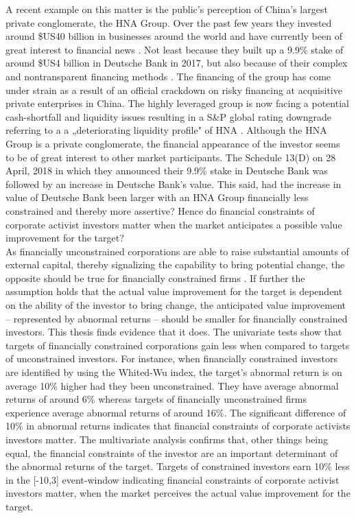\documentclass[12pt]{article}
\begin{document}
A recent example on this matter is the public's perception of China's largest private conglomerate, the HNA Group. Over the past few years they invested around \$US40 billion in businesses around the world and have currently been of great interest to financial news \citep{Smith2018}. Not least because they built up a 9.9\% stake of around \$US4 billion in Deutsche Bank in 2017, but also because of their complex and nontransparent financing methods \citep{Lockett2018}.
The financing of the group has come under strain as a result of an official crackdown on risky financing at acquisitive private enterprises in China. The highly leveraged group is now facing a potential cash-shortfall and liquidity issues resulting in a S\&P global rating downgrade referring to a a „deteriorating liquidity profile" of HNA \citep{Schuetze2018}. Although the HNA Group is a private conglomerate, the financial appearance of the investor seems to be of great interest to other market participants. The Schedule 13(D) on 28 April, 2018 in which they announced their 9.9\% stake in Deutsche Bank was followed by an increase in Deutsche Bank's value. This said, had the increase in value of Deutsche Bank been larger with an HNA Group financially less constrained and thereby more assertive? Hence do financial constraints of corporate activist investors matter when the market anticipates a possible value improvement for the target?\\ 
As financially unconstrained corporations are able to raise substantial amounts of external capital, thereby signalizing the capability to bring potential change, the opposite should be true for financially constrained firms \citep[p.1]{Farre-mensa2013}. If further the assumption holds that the actual value improvement for the target is dependent on the ability of the investor to bring change, the anticipated value improvement -- represented by abnormal returns -- should be smaller for financially constrained investors.
This thesis finds evidence that it does. The univariate tests show that targets of financially constrained corporations gain less when compared to targets of unconstrained investors. For instance, when financially constrained investors are identified by using the Whited-Wu index, the target's abnormal return is on average 10\% higher had they been unconstrained. They have average abnormal returns of around 6\% whereas targets of financially unconstrained firms experience average abnormal returns of around 16\%. The significant difference of 10\% in abnormal returns indicates that financial constraints of corporate activists investors matter. The multivariate analysis confirms that, other things being equal, the financial constraints of the investor are an important determinant of the abnormal returns of the target. Targets of constrained investors earn 10\% less in the [-10,3] event-window indicating financial constraints of corporate activist investors matter, when the market perceives the actual value improvement for the target. 
\end{document}
